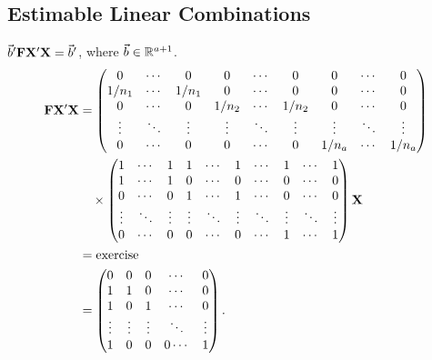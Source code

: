 \subsection*{Estimable Linear Combinations}
$ \vec{b}'\mathbf{F}\mathbf{X}'\mathbf{X}=\vec{b}' $,
where $ \vec{b}\in\mathbb{R}^{a+1} $.
\begin{align*}
    \mathbf{F}\mathbf{X}'\mathbf{X}
     & =\begin{pmatrix}
            0      & \cdots & 0      & 0      & \cdots & 0      & 0      & \cdots & 0      \\
            1/n_1  & \cdots & 1/n_1  & 0      & \cdots & 0      & 0      & \cdots & 0      \\
            0      & \cdots & 0      & 1/n_2  & \cdots & 1/n_2  & 0      & \cdots & 0      \\
            \vdots & \ddots & \vdots & \vdots & \ddots & \vdots & \vdots & \ddots & \vdots \\
            0      & \cdots & 0      & 0      & \cdots & 0      & 1/n_a  & \cdots & 1/n_a
        \end{pmatrix}                      \\
     & \quad \times \begin{pmatrix}
                        1      & \cdots & 1      & 1      & \cdots & 1      & \cdots & 1      & \cdots & 1      \\
                        1      & \cdots & 1      & 0      & \cdots & 0      & \cdots & 0      & \cdots & 0      \\
                        0      & \cdots & 0      & 1      & \cdots & 1      & \cdots & 0      & \cdots & 0      \\
                        \vdots & \ddots & \vdots & \vdots & \ddots & \vdots & \ddots & \vdots & \ddots & \vdots \\
                        0      & \cdots & 0      & 0      & \cdots & 0      & \cdots & 1      & \cdots & 1
                    \end{pmatrix}\mathbf{X} \\
     & =\text{exercise}                                                                                     \\
     & =\begin{pmatrix}
            0      & 0      & 0      & \cdots   & 0      \\
            1      & 1      & 0      & \cdots   & 0      \\
            1      & 0      & 1      & \cdots   & 0      \\
            \vdots & \vdots & \vdots & \ddots   & \vdots \\
            1      & 0      & 0      & 0 \cdots & 1
        \end{pmatrix}.
\end{align*}
